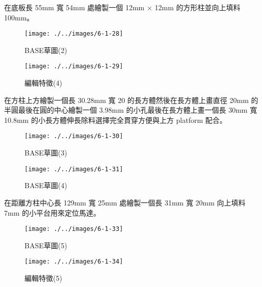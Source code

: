 在底板長 55mm 寬 54mm 處繪製一個 12mm $\times$ 12mm 的方形柱並向上填料 100mm。

\begin{figure}[h!]
    \centering
    \begin{minipage}[b]{0.6\textwidth}
        \centering
        \texttt{[image: ./../images/6-1-28]}
        \caption{BASE草圖(2)}
    \end{minipage}
    \hfill
    \begin{minipage}[b]{0.35\textwidth}
        \centering
        \texttt{[image: ./../images/6-1-29]} 
        \caption{編輯特徵(4)}
    \end{minipage}
\end{figure}

\newpage

在方柱上方繪製一個長 30.28mm 寬 20 的長方體然後在長方體上畫直徑 20mm 的半圓最後在圓的中心繪製一個 3.98mm 的小孔最後在長方體上畫一個長 30mm 寬 10.8mm 的小長方體伸長除料選擇完全貫穿方便與上方 platform 配合。

\begin{figure}[h!]
    \centering
    \begin{minipage}[b]{0.45\textwidth}
        \centering
        \texttt{[image: ./../images/6-1-30]}
        \caption{BASE草圖(3)}
    \end{minipage}
    \hfill
    \begin{minipage}[b]{0.45\textwidth}
        \centering
        \texttt{[image: ./../images/6-1-31]} 
        \caption{BASE草圖(4)}
    \end{minipage}
\end{figure}


在距離方柱中心長 129mm 寬 25mm 處繪製一個長 31mm 寬 20mm 向上填料 7mm 的小平台用來定位馬達。

\begin{figure}[h!]
    \centering
    \begin{minipage}[b]{0.6\textwidth}
        \centering
        \texttt{[image: ./../images/6-1-33]}
        \caption{BASE草圖(5)}
    \end{minipage}
    \hfill
    \begin{minipage}[b]{0.35\textwidth}
        \centering
        \texttt{[image: ./../images/6-1-34]} 
        \caption{編輯特徵(5)}
    \end{minipage}
\end{figure}


